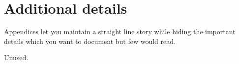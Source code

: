 \chapter{Additional details}
\label{app:details}

Appendices let you maintain a straight line story while hiding the important
details which you want to document but few would read.

Unused.
